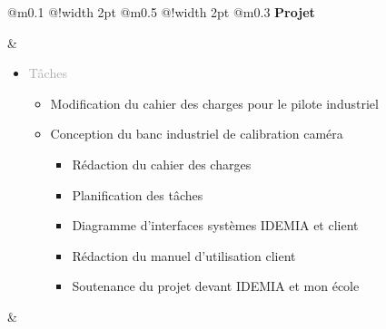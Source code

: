 \documentclass{article}
\begin{document}

\begin{tabular}
    {
        @{}m{}
        @{\hspace{0.001\textwidth}}!{\color{secondaryBlue}\vline width 2pt} %
        @{}m{0.5\textwidth}
        @{\hspace{0.025\textwidth}}!{\color{secondaryBlue}\vline width 2pt} %
        @{{\hspace{0.001\textwidth}}}m{0.3\textwidth}
    }
    \textcolor{secondaryBlue}
    {
        \textbf{Projet}
    } 

    &
    \begin{itemize}
        [label={}, topsep=8pt, partopsep=0pt, itemsep=0.5pt, parsep=2pt,after=\vspace*{-\baselineskip}]
        \setlength{\itemsep}{10pt}
        \item \textcolor{darkGray}{Tâches}
        \begin{itemize}
        [label={\textcolor{gray!100}{\checkmark}}, topsep=8pt, partopsep=0pt, itemsep=0.5pt, parsep=2pt, after=\vspace*{-\baselineskip}] 
            \item \textcolor{gray!100}{Modification du cahier des charges pour le pilote industriel}
            \item \textcolor{gray!100}{Conception du banc industriel de calibration caméra}
            \begin{itemize}
                [label={\textcolor{gray!100}{$\triangleright$}}, topsep=0pt, partopsep=0pt, itemsep=0.5pt, parsep=2pt]
                \item \textcolor{gray!100}{Rédaction du cahier des charges}
                \item \textcolor{gray!100}{Planification des tâches}
                \item \textcolor{gray!100}{Diagramme d'interfaces systèmes IDEMIA et client}
                \item \textcolor{gray!100}{Rédaction du manuel d'utilisation client}  
                \item \textcolor{gray!100}{Soutenance du projet devant IDEMIA et mon école}
            \end{itemize}
        \end{itemize}
    \end{itemize}
    &
    \begin{itemize}
        [label={}, topsep=8pt, partopsep=0pt, itemsep=0.5pt, parsep=2pt,after=\vspace*{-\baselineskip}]

\end{itemize}
\end{tabular}
\end{document}
